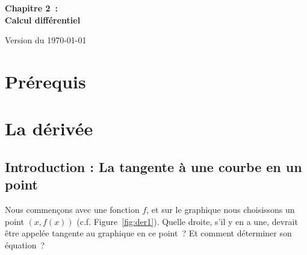 \documentclass[a4paper,12pt]{article}
\begin{document}
\setlength{\cftbeforesecskip}{2pt}

\setlength{\cftsecindent}{1em}
\begin{center}
{\bfseries \Huge Chapitre 2~: \\Calcul différentiel}
\vspace{1cm}

\end{center}\vspace{-1cm}
\tableofcontents
{\footnotesize Version du \today}
\newpage
\section*{Prérequis}

\newpage
\section{La dérivée}

\subsection{Introduction : La tangente à une courbe en un point}

Nous commençons avec une fonction $f$, et sur le graphique nous choisissons un point $(x, f(x))$ (c.f. Figure~\ref{fig:der1}). Quelle droite, s'il y en a une, devrait être appelée tangente au graphique en ce point~? Et comment déterminer son équation~?
\end{document}
